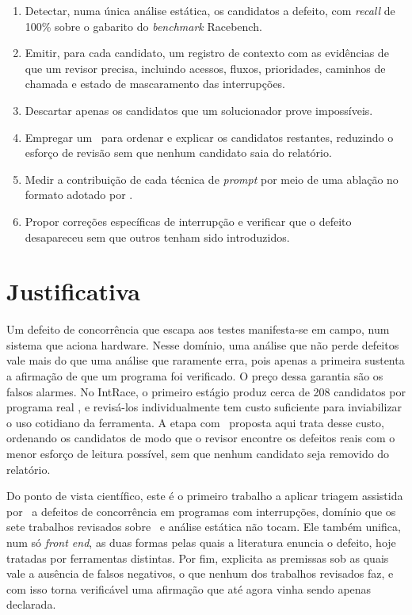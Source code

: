 \begin{enumerate}
  \item Detectar, numa única análise estática, os candidatos a defeito, com
    \textit{recall} de 100\% sobre o gabarito do \textit{benchmark} Racebench.
  \item Emitir, para cada candidato, um registro de contexto com as evidências
    de que um revisor precisa, incluindo acessos, fluxos, prioridades, caminhos
    de chamada e estado de mascaramento das interrupções.
  \item Descartar apenas os candidatos que um solucionador prove impossíveis.
  \item Empregar um \llm\ para ordenar e explicar os candidatos restantes,
    reduzindo o esforço de revisão sem que nenhum candidato saia do relatório.
  \item Medir a contribuição de cada técnica de \textit{prompt} por meio de uma
    ablação no formato adotado por .
  \item Propor correções específicas de interrupção e verificar que o defeito
    desapareceu sem que outros tenham sido introduzidos.
\end{enumerate}

\section{Justificativa}
\label{sec:justificativa}

Um defeito de concorrência que escapa aos testes manifesta-se em campo, num
sistema que aciona hardware. Nesse domínio, uma análise que não perde defeitos
vale mais do que uma análise que raramente erra, pois apenas a primeira sustenta
a afirmação de que um programa foi verificado. O preço dessa garantia são os
falsos alarmes. No IntRace, o primeiro estágio produz cerca de 208 candidatos
por programa real \cite{intrace}, e revisá-los individualmente tem custo
suficiente para inviabilizar o uso cotidiano da ferramenta. A etapa com \llm\
proposta aqui trata desse custo, ordenando os candidatos de modo
que o revisor encontre os defeitos reais com o menor esforço de leitura
possível, sem que nenhum candidato seja removido do relatório.

Do ponto de vista científico, este é o primeiro trabalho a aplicar triagem
assistida por \llm\ a defeitos de concorrência em programas com interrupções,
domínio que os sete trabalhos revisados sobre \llm\ e análise estática não
tocam. Ele também unifica, num só \textit{front end}, as duas formas pelas
quais a literatura enuncia o defeito, hoje tratadas por ferramentas distintas.
Por fim, explicita as premissas sob as quais vale a ausência de falsos
negativos, o que nenhum dos trabalhos revisados faz, e com isso torna
verificável uma afirmação que até agora vinha sendo apenas declarada.

